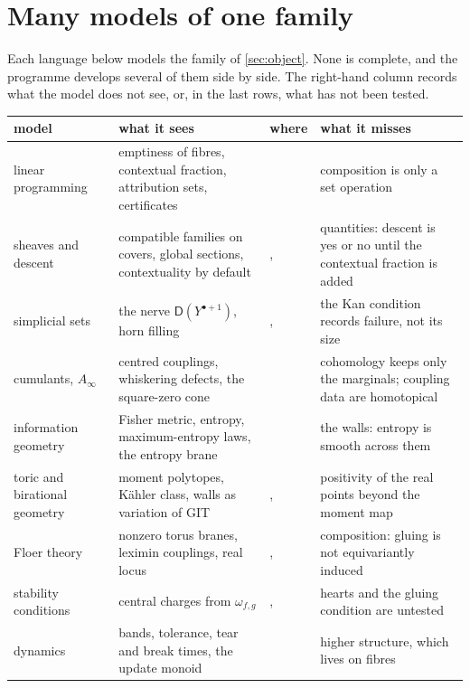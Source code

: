 \documentclass[11pt]{article}
\theoremstyle{definition}
\theoremstyle{remark}
\newcommand{\D}{\mathsf{D}}
\begin{document}
\section{Many models of one family}\label{sec:models}

Each language below models the family of \cref{sec:object}. None is complete, and the programme develops several of them side by side.
The right-hand column records what the model does not see, or, in the last rows, what has not been tested.

\begin{center}
\small
\begin{tabular}{p{2.4cm}p{4.7cm}p{3.1cm}p{4.3cm}}
\toprule
model & what it sees & where & what it misses\\
\midrule
linear programming & emptiness of fibres, contextual fraction, attribution sets, certificates & \cite{Attribution,Tower} & composition is only a set operation\\
sheaves and descent & compatible families on covers, global sections, contextuality by default & \cite{AbramskyBrandenburger2011,DzhafarovKujala2016}, \cite[\S4]{Bridges} & quantities: descent is yes or no until the contextual fraction is added\\
simplicial sets & the nerve $\D(Y^{\bullet+1})$, horn filling & \cite[\S4]{Conditionals}, \cite[Prop.~6.2]{Bands} & the Kan condition records failure, not its size\\
cumulants, $A_\infty$ & centred couplings, whiskering defects, the square-zero cone & \cite[\S5]{Conditionals} & cohomology keeps only the marginals; coupling data are homotopical\\
information geometry & Fisher metric, entropy, maximum-entropy laws, the entropy brane & \cite[\S\S2--3]{Bridges} & the walls: entropy is smooth across them\\
toric and birational geometry & moment polytopes, Kähler class, walls as variation of GIT & \cite[\S\S6, 10]{Conditionals}, \cite{Family} & positivity of the real points beyond the moment map\\
Floer theory & nonzero torus branes, leximin couplings, real locus & \cite[\S\S5, 8]{Bridges}, \cite[\S10.4]{Conditionals} & composition: gluing is not equivariantly induced \cite[Thm.~6.1]{Bridges}\\
stability conditions & central charges from $\omega_{f,g}$ & \cite{Family}, \cite[\S\S8, 10.3]{Conditionals} & hearts and the gluing condition are untested\\
dynamics & bands, tolerance, tear and break times, the update monoid & \cite{Bands} & higher structure, which lives on fibres\\
\bottomrule
\end{tabular}
\end{center}
\end{document}
